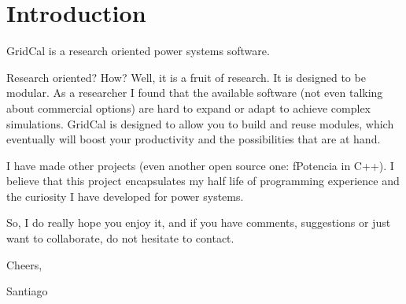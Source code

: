 \documentclass[11pt,fleqn]{book} %
\begin{document}

\pagestyle{empty} %

\renewcommand\contentsname{Table of content}
\tableofcontents%


\pagestyle{fancy} %



\chapter{Introduction}

GridCal is a research oriented power systems software.  \newline

Research oriented? How? Well, it is a fruit of research. It is designed to be modular. As a researcher I found that the available software (not even talking about commercial options) are hard to expand or adapt to achieve complex simulations. GridCal is designed to allow you to build and reuse modules, which eventually will boost your productivity and the possibilities that are at hand. \newline

I have made other projects (even another open source one: fPotencia in C++). I believe that this project encapsulates my half life of programming experience and the curiosity I have developed for power systems. \newline

So, I do really hope you enjoy it, and if you have comments, suggestions or just want to collaborate, do not hesitate to contact.\newline

\begin{flushright}
	Cheers, 

Santiago
\end{flushright}


\end{document}
